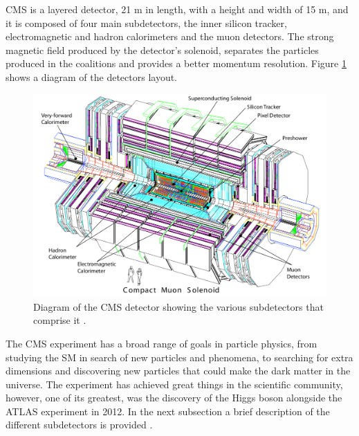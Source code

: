 CMS is a layered detector, 21 m in length, with a height and width of 15 m, and it is composed of four main subdetectors, the inner silicon tracker, electromagnetic and hadron calorimeters and the muon detectors. The strong magnetic field produced by the detector’s solenoid, separates the particles produced in the coalitions and provides a better momentum resolution. Figure \ref{cms} shows a diagram of the detectors layout. 
\begin{center}
  \begin{figure}[ht]
    \centering
    \includegraphics[scale=.2]{Chapter2/CMSl.png}
    \caption[CMS detector diagram]{Diagram of the CMS detector showing the various subdetectors that comprise it \cite{cms-manual}.}
    \label{cms}
  \end{figure}
\end{center}
The CMS experiment has a broad range of goals in particle physics, from studying the SM in search of new particles and phenomena, to searching for extra dimensions and discovering new particles that could make the dark matter in the universe.  The experiment has achieved great things in the scientific community, however, one of its greatest, was the discovery of the Higgs boson  alongside the ATLAS experiment in 2012. In the next subsection a brief description of the different subdetectors is provided \cite{cms-manual}.

